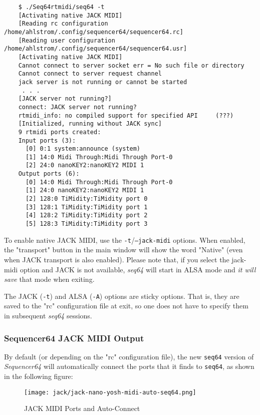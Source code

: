 \begin{verbatim}
	$ ./Seq64rtmidi/seq64 -t
	[Activating native JACK MIDI]
	[Reading rc configuration /home/ahlstrom/.config/sequencer64/sequencer64.rc]
	[Reading user configuration /home/ahlstrom/.config/sequencer64/sequencer64.usr]
	[Activating native JACK MIDI]
	Cannot connect to server socket err = No such file or directory
	Cannot connect to server request channel
	jack server is not running or cannot be started
     . . .
	[JACK server not running?]
	connect: JACK server not running?
	rtmidi_info: no compiled support for specified API     (???)
	[Initialized, running without JACK sync]
	9 rtmidi ports created:
	Input ports (3):
	  [0] 0:1 system:announce (system)
	  [1] 14:0 Midi Through:Midi Through Port-0
	  [2] 24:0 nanoKEY2:nanoKEY2 MIDI 1
	Output ports (6):
	  [0] 14:0 Midi Through:Midi Through Port-0 
	  [1] 24:0 nanoKEY2:nanoKEY2 MIDI 1 
	  [2] 128:0 TiMidity:TiMidity port 0 
	  [3] 128:1 TiMidity:TiMidity port 1 
	  [4] 128:2 TiMidity:TiMidity port 2 
	  [5] 128:3 TiMidity:TiMidity port 3 
\end{verbatim}

   To enable native JACK MIDI, use the
   \texttt{-t}/\texttt{--jack-midi} options.
   When enabled, the "transport" button in the main window will show the word
   "Native" (even when JACK transport is also enabled).  Please note that, if you
   select the jack-midi option and JACK is not available,
   \textsl{seq64} will start in
   ALSA mode and \textsl{it will save} that mode when exiting.

   The JACK (\texttt{-t}) and ALSA (\texttt{-A}) options are sticky options.
   That is, they are saved to the "rc" configuration file at exit,
   so one does not have to specify them in subsequent \textsl{seq64} sessions.

\subsubsection{Sequencer64 JACK MIDI Output}
\label{subsubsec:seq64_jack_midi_output}

   By default (or depending on the "rc" configuration file), the new
   \texttt{seq64} version of \textsl{Sequencer64} will
   automatically connect the ports that it finds to \texttt{seq64},
   as shown in the following figure:

\begin{figure}[H]
   \centering 
   \texttt{[image: jack/jack-nano-yosh-midi-auto-seq64.png]}
   \caption{JACK MIDI Ports and Auto-Connect}
   \label{fig:seq64_jack_nano_yosh_midi_auto}
\end{figure}

